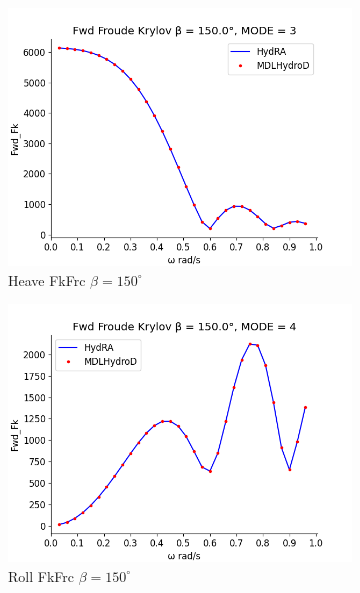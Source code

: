 \begin{figure}[H]
    \vspace{5pt}%
    \begin{subfigure}[b]{0.49\textwidth}
        \includegraphics[width=\textwidth]{plots/kcs/fk/fk3.png}
        \caption{Heave FkFrc $\beta = 150^{\circ}$}
    \end{subfigure}
    \begin{subfigure}[b]{0.49\textwidth}
        \includegraphics[width=\textwidth]{plots/kcs/fk/fk4.png}
        \caption{Roll FkFrc $\beta = 150^{\circ}$}
    \end{subfigure}
    \vspace{5pt}%
    \begin{subfigure}[b]{0.49\textwidth}

\end{subfigure}
\end{figure}
